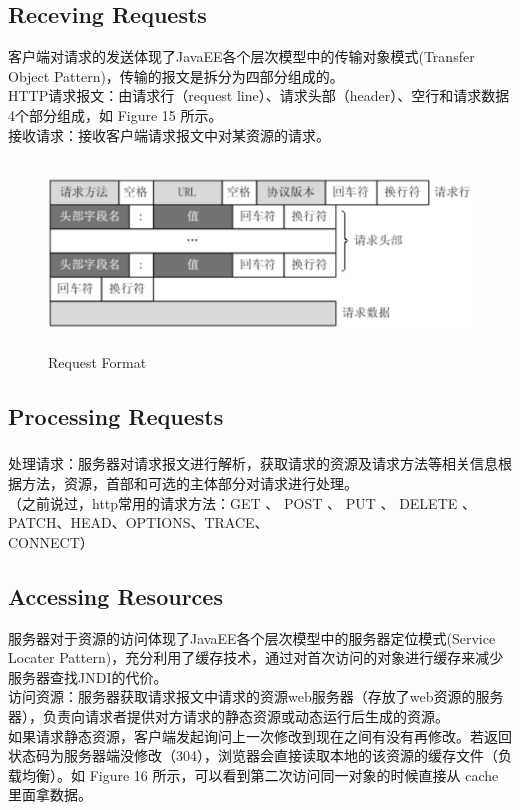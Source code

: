 \documentclass{article}
\begin{document}
	\subsection{Receving Requests}
	\begin{CJK}{UTF8}{gbsn}
		\indent 客户端对请求的发送体现了JavaEE各个层次模型中的传输对象模式(Transfer Object Pattern)，传输的报文是拆分为四部分组成的。\\
		\noindent HTTP请求报文：由请求行（request line）、请求头部（header）、空行和请求数据4个部分组成，如 Figure 15 所示。\\ 
		接收请求：接收客户端请求报文中对某资源的请求。
	\end{CJK}{}

	\begin{figure}[H]
		\centering
		\includegraphics[height = 5cm, width = 14cm]{pics/28_request_format.png}	
		\caption{Request Format}
	\end{figure}

	\subsection{Processing Requests}
	\begin{CJK}{UTF8}{gbsn}
		\subparagraph{}
		处理请求：服务器对请求报文进行解析，获取请求的资源及请求方法等相关信息根据方法，资源，首部和可选的主体部分对请求进行处理。\\
		（之前说过，http常用的请求方法：GET 、 POST 、 PUT 、 DELETE 、 PATCH、HEAD、OPTIONS、TRACE、\\
		CONNECT）
	\end{CJK}{}

	\subsection{Accessing Resources}
	\indent 
	\begin{CJK}{UTF8}{gbsn}
		\indent 服务器对于资源的访问体现了JavaEE各个层次模型中的服务器定位模式(Service Locater Pattern)，充分利用了缓存技术，通过对首次访问的对象进行缓存来减少服务器查找JNDI的代价。\\
		\indent 访问资源：服务器获取请求报文中请求的资源web服务器（存放了web资源的服务器），负责向请求者提供对方请求的静态资源或动态运行后生成的资源。\\
		\indent 如果请求静态资源，客户端发起询问上一次修改到现在之间有没有再修改。若返回状态码为服务器端没修改（304），浏览器会直接读取本地的该资源的缓存文件（负载均衡）。如 Figure 16 所示，可以看到第二次访问同一对象的时候直接从 cache 里面拿数据。
	\end{CJK}{}
\end{document}
